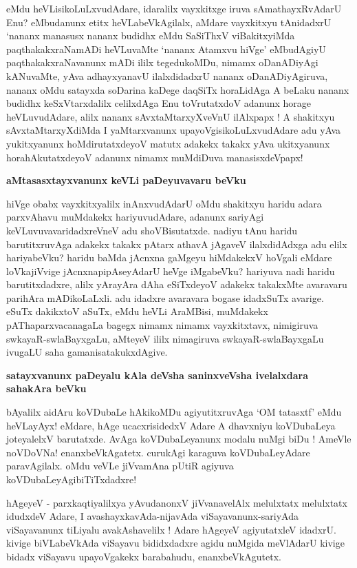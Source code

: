 \noindent
eMdu heVLisikoLuLxvudAdare, idaralilx vayxkitxge iruva sAmathayxRvAdarU 
Enu? eMbudanunx etitx\- heVLabeVkAgilalx, aMdare vayxkitxyu tAnidadxrU 
`nananx manasusx nananx budidhx eMdu SaSiThxV viBakitx\-yiMda 
paqthakakxraNamADi heVLuvaMte `nananx Atamxvu hiVge' eMbudAgiyU 
paqthakakxraNavanunx mADi ililx tegedu\-koMDu, nimamx oDanADiyAgi 
kANuvaMte, yAva adhayxyanavU ilalxdidadxrU nananx oDanADiyAgi\-ruva, 
nananx oMdu satayxda soDarina kaDege daqSiTx horaLidAga A beLaku nananx budidhx keSxVtarxdalilx celilxdAga Enu toVrutatxdoV adanunx horage heVLuvudAdare, alilx nananx sAvxtaMtarxyXveVnU ilAlxpapx ! A shakitxyu sAvxtaMtarxyX\-diMda I yaMtarxvanunx upayoVgisikoLuLxvudAdare adu yAva yukitxyanunx hoMdiru\-tatxdeyoV matutx adakekx takakx yAva ukitxyanunx horahAkutatxdeyoV adanunx nimamx muMdiDuva mana\-sisxdeVpapx!

{\bigskip
\noindent
{\large\bf aMtasasxtayxvanunx keVLi paDeyuvavaru beVku}}\label{page108}
\medskip

\noindent
hiVge obabx vayxkitxyalilx inAnxvudAdarU oMdu shakitxyu haridu adara parxvAhavu muMdakekx hariyuvu\-dAdare, adanunx sariyAgi keVLuvuvavaridadxreVneV adu shoVBisutatxde. nadiyu tAnu haridu baru\-titxru\-vAga adakekx takakx pAtarx athavA jAgaveV ilalxdidAdxga adu elilx hariyabeVku? haridu baMda jAcnxna gaMgeyu hiMdakekxV hoVgali eMdare loVkajiVvige jAcnxnapipAseyAdarU heVge iMgabeVku? hariyuva nadi haridu barutitxdadxre, alilx yArayAra dAha eSiTxdeyoV adakekx takakxMte avaravaru parihAra mADi\-koLaLxli. adu idadxre avaravara bogase idadxSuTx avarige. eSuTx dakikxtoV aSuTx, eMdu heVLi AraMBisi, muMdakekx pAThaparxvacanagaLa bagegx nimamx nimamx vayxkitxtavx, nimigiruva swkayaR-swlaBayxgaLu, aMteyeV ililx nimagiruva swkayaR-swlaBayxgaLu ivugaLU saha gamanisatakukxdAgive.

{\bigskip
\noindent
{\large\bf satayxvanunx paDeyalu kAla deVsha saninxveVsha ivelalxdara sahakAra beVku}}\label{page109}
\medskip

\noindent
bAyalilx aidAru koVDubaLe hAkikoMDu agiyutitxruvAga `OM tatasxtf' eMdu heVLayAyx! eMdare, hAge ucacxrisidedxV Adare A dhavxniyu koVDubaLeya joteyalelxV barutatxde. AvAga koVDubaLeyanunx modalu nuMgi biDu ! AmeVle noVDoVNa! enanxbeVkAgatetx. curukAgi karaguva koVDubaLeyAdare paravAgilalx. oMdu veVLe jiVvamAna pUtiR agiyuva koVDubaLeyAgibiTiTxdadxre!

hAgeyeV - parxkaqtiyalilxya yAvudanonxV jiVvanavelAlx melulxtatx melulxtatx idudxdeV Adare, I avashayxka\-vAda-nijavAda viSaya\-vanunx-sariyAda viSaya\-vanunx tiLiyalu avakAshavelilx ! Adare hAgeyeV agi\-yu\-tatxleV idadxrU. kivige biVLabeVkAda viSayavu bididxdadxre agidu nuMgida meVlAdarU kivige bidadx viSayavu upayoVgakekx barabahudu, enanxbeVkAgutetx.

